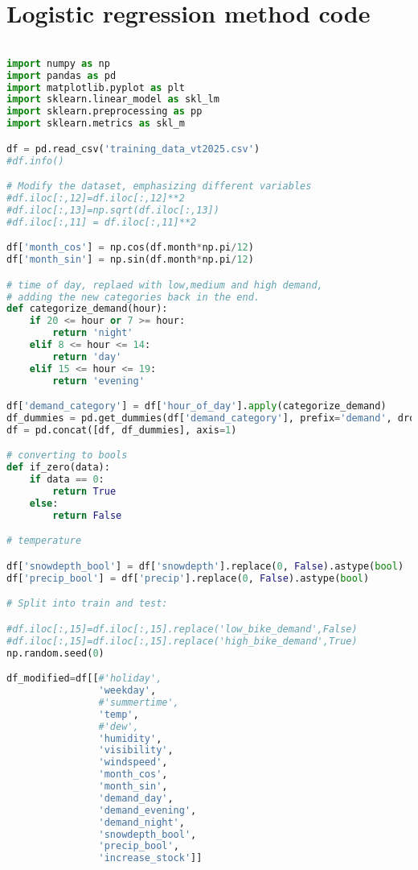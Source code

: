 
  
\section*{Logistic regression method code}
\begin{lstlisting}[language = Python]

import numpy as np
import pandas as pd
import matplotlib.pyplot as plt
import sklearn.linear_model as skl_lm
import sklearn.preprocessing as pp
import sklearn.metrics as skl_m

df = pd.read_csv('training_data_vt2025.csv')
#df.info()

# Modify the dataset, emphasizing different variables
#df.iloc[:,12]=df.iloc[:,12]**2
#df.iloc[:,13]=np.sqrt(df.iloc[:,13])
#df.iloc[:,11] = df.iloc[:,11]**2

df['month_cos'] = np.cos(df.month*np.pi/12)
df['month_sin'] = np.sin(df.month*np.pi/12)

# time of day, replaed with low,medium and high demand, 
# adding the new categories back in the end.
def categorize_demand(hour):
    if 20 <= hour or 7 >= hour:
        return 'night'
    elif 8 <= hour <= 14:
        return 'day'
    elif 15 <= hour <= 19:
        return 'evening'

df['demand_category'] = df['hour_of_day'].apply(categorize_demand)
df_dummies = pd.get_dummies(df['demand_category'], prefix='demand', drop_first=False)
df = pd.concat([df, df_dummies], axis=1)

# converting to bools
def if_zero(data):
    if data == 0:
        return True
    else:
        return False

# temperature

df['snowdepth_bool'] = df['snowdepth'].replace(0, False).astype(bool)
df['precip_bool'] = df['precip'].replace(0, False).astype(bool)

# Split into train and test:

#df.iloc[:,15]=df.iloc[:,15].replace('low_bike_demand',False)
#df.iloc[:,15]=df.iloc[:,15].replace('high_bike_demand',True)
np.random.seed(0)

df_modified=df[[#'holiday',
                'weekday',
                #'summertime',
                'temp',
                #'dew',
                'humidity',
                'visibility',
                'windspeed',
                'month_cos',
                'month_sin',
                'demand_day',
                'demand_evening',
                'demand_night',
                'snowdepth_bool',
                'precip_bool',
                'increase_stock']]


\end{lstlisting}
